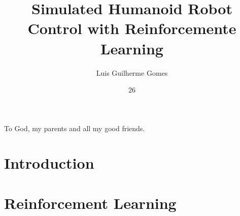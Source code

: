 \documentclass[tg, eng]{ita}    %
\author{Luis Guilherme Gomes}{Aguiar}
\title{Simulated Humanoid Robot Control with Reinforcemente Learning}
\date{26}{Junho}{2018}
\begin{document}
\maketitle

\begin{itadedication}
To God, my parents and all my good friends.
\end{itadedication}

\begin{itathanks}

\end{itathanks}


\begin{abstract}
\noindent

\end{abstract}

\begin{englishabstract}
\noindent

\end{englishabstract}

\listoffigures %

\listoftables %

\listofabbreviations

\listofsymbols

\tableofcontents

\mainmatter

\chapter{Introduction}
\label{chap:introduction}


\chapter{Reinforcement Learning}
\label{chap:rl}

\end{document}

